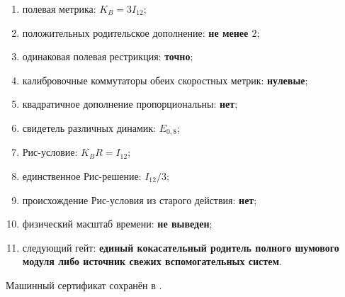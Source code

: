 \begin{protocol}
\begin{enumerate}
 \item полевая метрика: \textbf{$K_B=3I_{12}$};
 \item положительных родительское дополнение: \textbf{не менее $2$};
 \item одинаковая полевая рестрикция: \textbf{точно};
 \item калибровочные коммутаторы обеих скоростных метрик: \textbf{нулевые};
 \item квадратичное дополнение пропорциональны: \textbf{нет};
 \item свидетель различных динамик: \textbf{$E_{0,8}$};
 \item Рис-условие: \textbf{$K_BR=I_{12}$};
 \item единственное Рис-решение: \textbf{$I_{12}/3$};
 \item происхождение Рис-условия из старого действия: \textbf{нет};
 \item физический масштаб времени: \textbf{не выведен};
 \item следующий гейт: \textbf{единый кокасательный родитель полного шумового
       модуля либо источник свежих вспомогательных систем}.
\end{enumerate}
\end{protocol}

Машинный сертификат сохранён в
.
